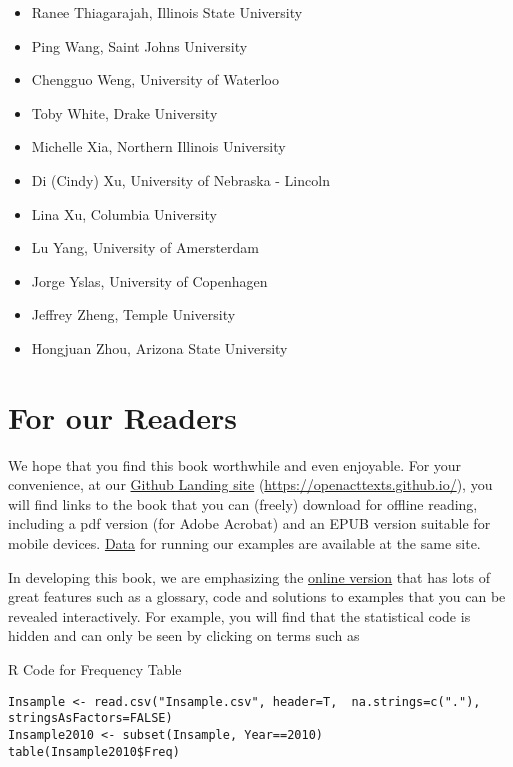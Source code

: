 \documentclass[]{book}
\begin{document}
\begin{itemize}
\item
  Ranee Thiagarajah, Illinois State University
\item
  Ping Wang, Saint Johns University
\item
  Chengguo Weng, University of Waterloo
\item
  Toby White, Drake University
\item
  Michelle Xia, Northern Illinois University
\item
  Di (Cindy) Xu, University of Nebraska - Lincoln
\item
  Lina Xu, Columbia University
\item
  Lu Yang, University of Amersterdam
\item
  Jorge Yslas, University of Copenhagen
\item
  Jeffrey Zheng, Temple University
\item
  Hongjuan Zhou, Arizona State University
\end{itemize}

\section*{For our Readers}\label{for-our-readers}

We hope that you find this book worthwhile and even enjoyable. For your
convenience, at our \href{https://openacttexts.github.io/}{Github
Landing site} (\url{https://openacttexts.github.io/}), you will find
links to the book that you can (freely) download for offline reading,
including a pdf version (for Adobe Acrobat) and an EPUB version suitable
for mobile devices.
\href{https://github.com/OpenActTexts/Loss-Data-Analytics/tree/master/Data}{Data}
for running our examples are available at the same site.

In developing this book, we are emphasizing the
\href{https://openacttexts.github.io/Loss-Data-Analytics/index.html}{online
version} that has lots of great features such as a glossary, code and
solutions to examples that you can be revealed interactively. For
example, you will find that the statistical code is hidden and can only
be seen by clicking on terms such as

R Code for Frequency Table

\hypertarget{display.T:Frequency.2Intro}{}
\begin{verbatim}
Insample <- read.csv("Insample.csv", header=T,  na.strings=c("."), stringsAsFactors=FALSE)
Insample2010 <- subset(Insample, Year==2010)
table(Insample2010$Freq)
\end{verbatim}
\end{document}
